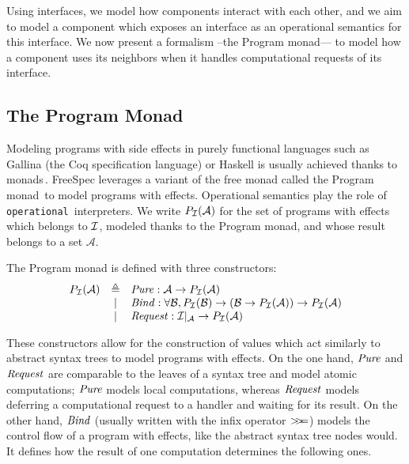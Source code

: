 Using interfaces, we model how components interact with each other, and we aim
to model a component which exposes an interface as an operational semantics for
this interface.
%
We now present a formalism --the Program monad--- to model how a component uses
its neighbors when it handles computational requests of its interface.

\subsection{The Program Monad}

Modeling programs with side effects in purely functional languages such as
{\textsc Gallina} (the Coq specification language) or Haskell is usually
achieved thanks to monads\,\cite{hoareetal2001monad}.
%
FreeSpec leverages a variant of the free monad called the Program
monad\,\cite{operational} to model programs with effects.
%
Operational semantics play the role of \texttt{operational}\,\cite{operational}
interpreters.
%
We write $P_{\mathcal{I}}(\mathcal{A})$ for the set of programs with effects which
belongs to $\mathcal{I}$, modeled thanks to the Program monad, and whose result belongs
to a set $\mathcal{A}$.

\begin{definition}
  The Program monad is defined with three constructors:
  \[
    \begin{array}{rcl}
      P_{\mathcal{I}}(\mathcal{A})
      & \triangleq
      & \mathit{Pure} : \mathcal{A} \rightarrow P_{\mathcal{I}}(\mathcal{A}) \\

      & |
      & \mathit{Bind} : \forall \mathcal{B}, P_{\mathcal{I}}(\mathcal{B}) \rightarrow
        (\mathcal{B} \rightarrow P_{\mathcal{I}}(\mathcal{A})) \rightarrow
        P_{\mathcal{I}}(\mathcal{A}) \\

      & |
      & \mathit{Request} : \mathcal{I}|_{\mathcal{A}} \rightarrow
        P_{\mathcal{I}}(\mathcal{A})
    \end{array}
  \]
\end{definition}
%
These constructors allow for the construction of values which act similarly to
abstract syntax trees to model programs with effects.
%
On the one hand, $\mathit{Pure}$ and $\mathit{Request}$ are comparable to the leaves
of a syntax tree and model atomic computations; $\mathit{Pure}$ models local
computations, whereas $\mathit{Request}$ models deferring a computational request
to a handler and waiting for its result.
%
On the other hand, $\mathit{Bind}$ (usually written with the infix operator
$>\!\!>\!\!=$) models the control flow of a program with effects, like the abstract
syntax tree nodes would.
%
It defines how the result of one computation determines the following ones.

